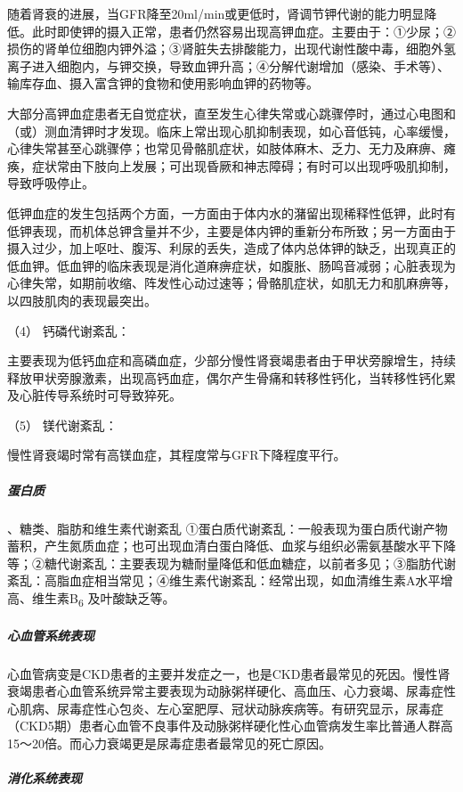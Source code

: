 随着肾衰的进展，当GFR降至20ml/min或更低时，肾调节钾代谢的能力明显降低。此时即使钾的摄入正常，患者仍然容易出现高钾血症。主要由于：①少尿；②损伤的肾单位细胞内钾外溢；③肾脏失去排酸能力，出现代谢性酸中毒，细胞外氢离子进入细胞内，与钾交换，导致血钾升高；④分解代谢增加（感染、手术等）、输库存血、摄入富含钾的食物和使用影响血钾的药物等。

大部分高钾血症患者无自觉症状，直至发生心律失常或心跳骤停时，通过心电图和（或）测血清钾时才发现。临床上常出现心肌抑制表现，如心音低钝，心率缓慢，心律失常甚至心跳骤停；也常见骨骼肌症状，如肢体麻木、乏力、无力及麻痹、瘫痪，症状常由下肢向上发展；可出现昏厥和神志障碍；有时可以出现呼吸肌抑制，导致呼吸停止。

低钾血症的发生包括两个方面，一方面由于体内水的潴留出现稀释性低钾，此时有低钾表现，而机体总钾含量并不少，主要是体内钾的重新分布所致；另一方面由于摄入过少，加上呕吐、腹泻、利尿的丢失，造成了体内总体钾的缺乏，出现真正的低血钾。低血钾的临床表现是消化道麻痹症状，如腹胀、肠鸣音减弱；心脏表现为心律失常，如期前收缩、阵发性心动过速等；骨骼肌症状，如肌无力和肌麻痹等，以四肢肌肉的表现最突出。

\hypertarget{text00085.htmlux5cux23CHP3-8-6-1-1-4}{}
（4） 钙磷代谢紊乱：

主要表现为低钙血症和高磷血症，少部分慢性肾衰竭患者由于甲状旁腺增生，持续释放甲状旁腺激素，出现高钙血症，偶尔产生骨痛和转移性钙化，当转移性钙化累及心脏传导系统时可导致猝死。

\hypertarget{text00085.htmlux5cux23CHP3-8-6-1-1-5}{}
（5） 镁代谢紊乱：

慢性肾衰竭时常有高镁血症，其程度常与GFR下降程度平行。

\subparagraph{蛋白质}

、糖类、脂肪和维生素代谢紊乱
①蛋白质代谢紊乱：一般表现为蛋白质代谢产物蓄积，产生氮质血症；也可出现血清白蛋白降低、血浆与组织必需氨基酸水平下降等；②糖代谢紊乱：主要表现为糖耐量降低和低血糖症，以前者多见；③脂肪代谢紊乱：高脂血症相当常见；④维生素代谢紊乱：经常出现，如血清维生素A水平增高、维生素B\textsubscript{6}
及叶酸缺乏等。

\subparagraph{心血管系统表现}

心血管病变是CKD患者的主要并发症之一，也是CKD患者最常见的死因。慢性肾衰竭患者心血管系统异常主要表现为动脉粥样硬化、高血压、心力衰竭、尿毒症性心肌病、尿毒症性心包炎、左心室肥厚、冠状动脉疾病等。有研究显示，尿毒症（CKD5期）患者心血管不良事件及动脉粥样硬化性心血管病发生率比普通人群高15～20倍。而心力衰竭更是尿毒症患者最常见的死亡原因。

\subparagraph{消化系统表现}

